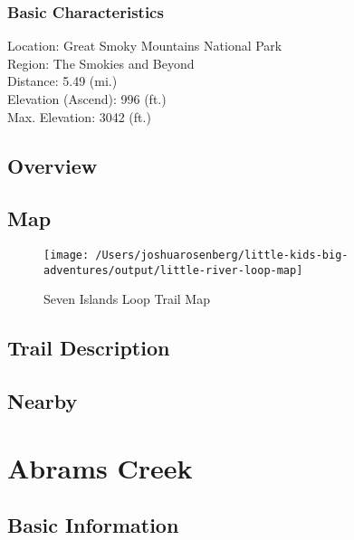\documentclass[
]{book}
\begin{document}
\hypertarget{basic-characteristics-12}{%
\subsection{Basic Characteristics}\label{basic-characteristics-12}}

Location: Great Smoky Mountains National Park\\
Region: The Smokies and Beyond\\
Distance: 5.49 (mi.)\\
Elevation (Ascend): 996 (ft.)\\
Max. Elevation: 3042 (ft.)

\hypertarget{overview-12}{%
\section{Overview}\label{overview-12}}

\hypertarget{map-12}{%
\section{Map}\label{map-12}}

\begin{figure}
\texttt{[image: /Users/joshuarosenberg/little-kids-big-adventures/output/little-river-loop-map]} \caption{Seven Islands Loop Trail Map}\label{fig:unnamed-chunk-33}
\end{figure}

\hypertarget{trail-description-12}{%
\section{Trail Description}\label{trail-description-12}}

\hypertarget{nearby-12}{%
\section{Nearby}\label{nearby-12}}

\hypertarget{abrams-creek}{%
\chapter{Abrams Creek}\label{abrams-creek}}

\hypertarget{basic-information}{%
\section{Basic Information}\label{basic-information}}
\end{document}
